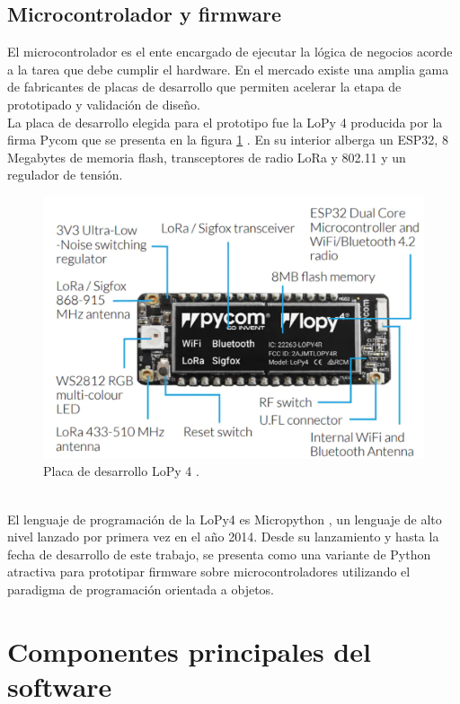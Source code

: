 \subsection{Microcontrolador y firmware}
El microcontrolador es el ente encargado de ejecutar la lógica de negocios acorde a la tarea que debe cumplir el hardware. En el mercado existe una amplia gama de fabricantes de placas de desarrollo que permiten acelerar la etapa de prototipado y validación de diseño.\\
La placa de desarrollo elegida para el prototipo fue la LoPy 4 producida por la firma Pycom que se presenta en la figura \ref{fig:lopy4} . En su interior alberga un ESP32, 8 Megabytes de memoria flash, transceptores de radio LoRa y 802.11 y un regulador de tensión.\\
\begin{figure}[h]
	\centering
	\includegraphics[width=0.95\linewidth]{Figures/lopy4}
	\caption{Placa de desarrollo LoPy 4 \citep{lopy4}.}
	\label{fig:lopy4}
\end{figure}\\
El lenguaje de programación de la LoPy4 es Micropython \citep{micropy}, un lenguaje de alto nivel lanzado por primera vez en el año 2014. Desde su lanzamiento y hasta la fecha de desarrollo de este trabajo, se presenta como una variante de Python atractiva para prototipar firmware sobre microcontroladores utilizando el paradigma de programación orientada a objetos.\\


\section{Componentes principales del software}
